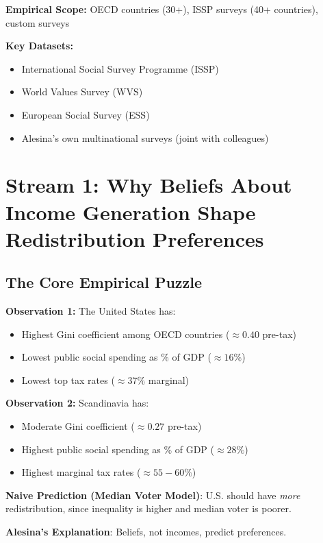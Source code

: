 \textbf{Empirical Scope:} OECD countries (30+), ISSP surveys (40+ countries), custom surveys

\textbf{Key Datasets:}
\begin{itemize}
\item International Social Survey Programme (ISSP)
\item World Values Survey (WVS)
\item European Social Survey (ESS)
\item Alesina's own multinational surveys (joint with colleagues)
\end{itemize}

\clearpage


\section{Stream 1: Why Beliefs About Income Generation Shape Redistribution Preferences}
\label{sec:alesina-redistribution}

\subsection{The Core Empirical Puzzle}

\begin{tcolorbox}[colback=red!5!white, colframe=red!75!black,
    title=The Redistribution Paradox]

\textbf{Observation 1:} The United States has:
\begin{itemize}[nosep]
\item Highest Gini coefficient among OECD countries ($\approx 0.40$ pre-tax)
\item Lowest public social spending as \% of GDP ($\approx 16\%$)
\item Lowest top tax rates ($\approx 37\%$ marginal)
\end{itemize}

\textbf{Observation 2:} Scandinavia has:
\begin{itemize}[nosep]
\item Moderate Gini coefficient ($\approx 0.27$ pre-tax)
\item Highest public social spending as \% of GDP ($\approx 28\%$)
\item Highest marginal tax rates ($\approx 55-60\%$)
\end{itemize}

\textbf{Naive Prediction (Median Voter Model)}: U.S. should have \emph{more} redistribution, since inequality is higher and median voter is poorer.

\textbf{Alesina's Explanation}: Beliefs, not incomes, predict preferences.

\end{tcolorbox}

